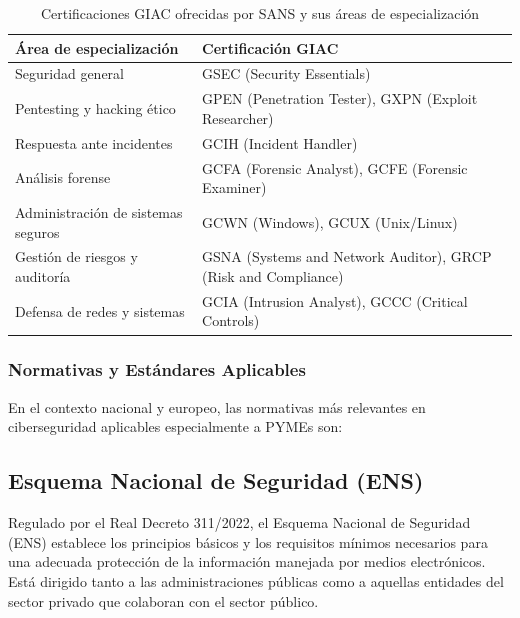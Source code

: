 \documentclass[a4paper, 10pt]{article}
\begin{document}
\begin{table}[H]
\centering
\caption{Certificaciones GIAC ofrecidas por SANS y sus áreas de especialización}
\begin{tabular}{|l|l|}
\hline
\textbf{Área de especialización} & \textbf{Certificación GIAC} \\
\hline
Seguridad general & GSEC (Security Essentials) \\
Pentesting y hacking ético & GPEN (Penetration Tester), GXPN (Exploit Researcher) \\
Respuesta ante incidentes & GCIH (Incident Handler) \\
Análisis forense & GCFA (Forensic Analyst), GCFE (Forensic Examiner) \\
Administración de sistemas seguros & GCWN (Windows), GCUX (Unix/Linux) \\
Gestión de riesgos y auditoría & GSNA (Systems and Network Auditor), GRCP (Risk and Compliance) \\
Defensa de redes y sistemas & GCIA (Intrusion Analyst), GCCC (Critical Controls) \\
\hline
\end{tabular}
\label{tab:giac-certificaciones}
\end{table}

\subsubsection{Normativas y Estándares Aplicables}
\par\vspace{0.5cm}

En el contexto nacional y europeo, las normativas más relevantes en ciberseguridad aplicables especialmente a PYMEs son:
\par\vspace{0.5cm}

\subsection*{Esquema Nacional de Seguridad (ENS)}

Regulado por el Real Decreto 311/2022, el Esquema Nacional de Seguridad (ENS) establece los principios básicos y los requisitos mínimos necesarios para una adecuada protección de la información manejada por medios electrónicos. Está dirigido tanto a las administraciones públicas como a aquellas entidades del sector privado que colaboran con el sector público.
\par\vspace{0.5cm}
\end{document}
